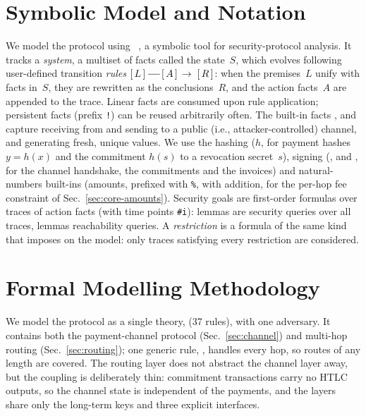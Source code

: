 \section{Symbolic Model and Notation}\label{sec:symbolic}

We model the protocol using \tamarin~\cite{meier2013}, a symbolic tool for security-protocol
analysis. It tracks a \emph{system}, a multiset of facts called the state~$S$, which
evolves following user-defined transition \emph{rules}
$[\,L\,]\;\rule[0.55ex]{1.2em}{0.4pt}\,[\,A\,]\,\rightarrow\;[\,R\,]$: when the premises~$L$
unify with facts in~$S$, they are rewritten as the conclusions~$R$, and the action facts~$A$ are
appended to the trace. Linear facts are consumed upon rule application; persistent facts
(prefix \texttt{!}) can be reused arbitrarily often. The built-in facts ,
 and  capture receiving from and sending to a public (i.e.,
attacker-controlled) channel, and generating fresh, unique values. We use the hashing
($h$, for payment hashes $y = h(x)$ and the commitment $h(s)$ to a revocation secret~$s$),
signing (,  and , for the channel handshake, the commitments and
the invoices) and natural-numbers built-ins (amounts, prefixed with \texttt{\%}, with addition,
for the per-hop fee constraint of Sec.~\ref{sec:core-amounts}). Security goals are first-order
formulas over traces of action facts (with time points \texttt{\#i}):  lemmas
are security queries over all traces,  lemmas reachability queries. A \emph{restriction} is a formula of the
same kind that \tamarin{} imposes on the model: only traces satisfying every restriction are
considered.

\section{Formal Modelling Methodology}\label{sec:method}

We model the protocol as a single \tamarin{} theory,  (37 rules), with one
adversary. It contains both the payment-channel protocol (Sec.~\ref{sec:channel}) and
multi-hop routing (Sec.~\ref{sec:routing}); one generic rule, , handles every
hop, so routes of any length are covered. The routing layer does not abstract the
channel layer away, but the coupling is deliberately thin: commitment transactions carry no HTLC
outputs, so the channel state is independent of the payments, and the layers share only the
long-term keys and three explicit interfaces.

